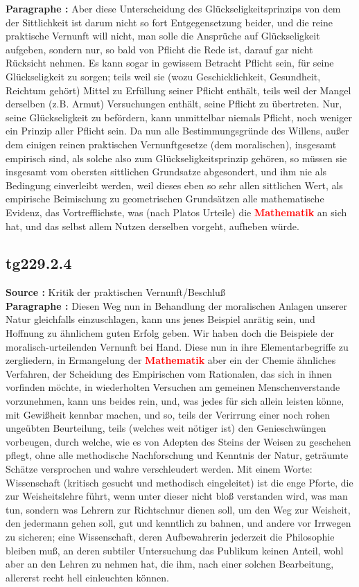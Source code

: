 \documentclass[a4paper,12pt,twoside]{book}
\newcommand{\match}[1]{\textcolor{red}{\textbf{#1}}}
\begin{document}
	\noindent\textbf{Paragraphe : }Aber diese Unterscheidung des Glückseligkeitsprinzips von dem der Sittlichkeit ist darum nicht so fort Entgegensetzung beider, und die reine praktische Vernunft will nicht, man solle die Ansprüche auf Glückseligkeit aufgeben, sondern nur, so bald von Pflicht die Rede ist, darauf gar nicht Rücksicht nehmen. Es kann sogar in gewissem Betracht Pflicht sein, für seine Glückseligkeit zu sorgen; teils weil sie (wozu Geschicklichkeit, Gesundheit, Reichtum gehört) Mittel zu Erfüllung seiner Pflicht enthält, teils weil der Mangel derselben (z.B. Armut) Versuchungen enthält, seine Pflicht zu übertreten. Nur, seine Glückseligkeit zu befördern,  kann unmittelbar niemals Pflicht, noch weniger ein Prinzip aller Pflicht sein. Da nun alle Bestimmungsgründe des Willens, außer dem einigen reinen praktischen Vernunftgesetze (dem moralischen), insgesamt empirisch sind, als solche also zum Glückseligkeitsprinzip gehören, so müssen sie insgesamt vom obersten sittlichen Grundsatze abgesondert, und ihm nie als Bedingung einverleibt werden, weil dieses eben so sehr allen sittlichen Wert, als empirische Beimischung zu geometrischen Grundsätzen alle mathematische Evidenz, das Vortrefflichste, was (nach Platos Urteile) die \match{Mathematik} an sich hat, und das selbst allem Nutzen derselben vorgeht, aufheben würde. 
	
	\subsection*{tg229.2.4} 
	\textbf{Source : }Kritik der praktischen Vernunft/Beschluß\\  
	
	\noindent\textbf{Paragraphe : }Diesen Weg nun in Behandlung der moralischen Anlagen unserer Natur gleichfalls einzuschlagen, kann uns jenes Beispiel anrätig sein, und Hoffnung zu ähnlichem guten Erfolg geben. Wir haben doch die Beispiele der moralisch-urteilenden Vernunft bei Hand. Diese nun in ihre Elementarbegriffe zu zergliedern, in Ermangelung der \match{Mathematik} aber ein der Chemie ähnliches Verfahren, der Scheidung des Empirischen vom Rationalen, das sich in ihnen vorfinden  möchte, in wiederholten Versuchen am gemeinen Menschenverstande vorzunehmen, kann uns beides rein, und, was jedes für sich allein leisten könne, mit Gewißheit kennbar machen, und so, teils der Verirrung einer noch rohen ungeübten Beurteilung, teils (welches weit nötiger ist) den Genieschwüngen vorbeugen, durch welche, wie es von Adepten des Steins der Weisen zu geschehen pflegt, ohne alle methodische Nachforschung und Kenntnis der Natur, geträumte Schätze versprochen und wahre verschleudert werden. Mit einem Worte: Wissenschaft (kritisch gesucht und methodisch eingeleitet) ist die enge Pforte, die zur Weisheitslehre führt, wenn unter dieser nicht bloß verstanden wird, was man tun, sondern was Lehrern zur Richtschnur dienen soll, um den Weg zur Weisheit, den jedermann gehen soll, gut und kenntlich zu bahnen, und andere vor Irrwegen zu sicheren; eine Wissenschaft, deren Aufbewahrerin jederzeit die Philosophie bleiben muß, an deren subtiler Untersuchung das Publikum keinen Anteil, wohl aber an den Lehren zu nehmen hat, die ihm, nach einer solchen Bearbeitung, allererst recht hell einleuchten können. 
	
\end{document}

